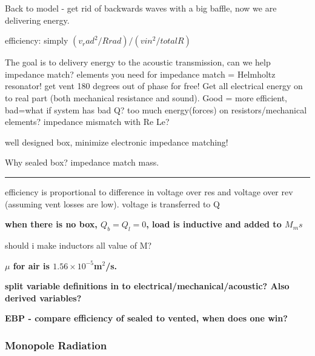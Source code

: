 \documentclass[10pt,letterpaper]{article}
\begin{document}
Back to model - get rid of backwards waves with a big baffle, now we are delivering energy.

efficiency: simply $(v_rad^2/Rrad) / (vin^2/totalR)$

The goal is to delivery energy to the acoustic transmission, can we help impedance match? elements you need for impedance match = Helmholtz resonator! get vent 180 degrees out of phase for free! Get all electrical energy on to real part (both mechanical resistance and sound). Good = more efficient, bad=what if system has bad Q? too much energy(forces) on resistors/mechanical elements? impedance mismatch with Re Le?

well designed box, minimize electronic impedance matching!

Why sealed box? impedance match mass.


\hrule

efficiency is proportional to difference in voltage over res and voltage over rev (assuming vent losses are low). voltage is transferred to Q

\textbf{when there is no box, $Q_b=Q_l=0$, load is inductive and added to $M_ms$}

should i make inductors all value of M?


\textbf{$\mu$ for air is $1.56\times10^{-5}$m$^2$/s.}

\textbf{split variable definitions in to electrical/mechanical/acoustic? Also derived variables?}

\textbf{EBP - compare efficiency of sealed to vented, when does one win?}

\subsubsection{Monopole Radiation}


%
%
 
\end{document}
